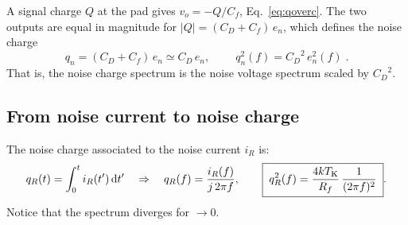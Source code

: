 \documentclass[11pt,a4paper]{article}
\newcommand{\dd}{\mathrm{d}}
\newcommand{\CD}{\ensuremath{C_D}}
\newcommand{\Cf}{\ensuremath{C_f}}
\begin{document}
A signal charge $Q$ at the pad gives
$v_o=-Q/\Cf$, Eq.~\eqref{eq:qoverc}. The two outputs are equal in magnitude
for $|Q|=(\CD+\Cf)\,e_n$, which defines the noise charge
%
\begin{equation}
 q_n = (\CD+\Cf)\,e_n \simeq \CD\,e_n ,
 \qquad
 \boxed{\;q_n^2(f) = \CD^2\, e_n^2(f)\;} .
\label{eq:qn}
\end{equation}
%
That is, the noise charge spectrum is the noise voltage
spectrum scaled by $\CD^2$.


\subsection{From noise current to noise charge}
%
The noise charge associated to the noise current $i_R$ is:
%
\begin{equation}
 q_R(t)=\int_0^t i_R(t')\,\dd t'
 \quad\Rightarrow\quad
 q_R(f)=\frac{i_R(f)}{j\,2\pi f} ,
 \qquad
 \boxed{\;q_R^2(f) = \frac{4kT_{\rm K}}{R_f}\,\frac{1}{(2\pi f)^2}\;} .
\label{eq:qR}
\end{equation}
%
Notice that the spectrum diverges for $ \rightarrow 0$. 
\end{document}
